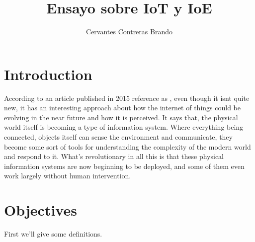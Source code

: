 \documentclass{IEEEtran}
\title{Ensayo sobre IoT y IoE}
\author{Cervantes Contreras Brando}
\begin{document}
\maketitle


\section{Introduction} \label{introduction}
 According to an article published in 2015 reference as \cite{keylchui2010internetist}, even though it isnt quite new, it has an interesting approach
 about how the internet of things could be evolving in the near future and how it is perceived.
 It says that, the physical world itself is becoming a type of information system.
 Where everything being connected, objects itself can sense the environment 
 and communicate, they become some sort of tools for understanding 
 the complexity of the modern world and respond to it.
 What’s revolutionary in all this is that these physical information systems are now beginning to 
 be deployed, and some of them even work largely without human intervention.



\section{Objectives}

First we'll give some definitions.
\end{document}
